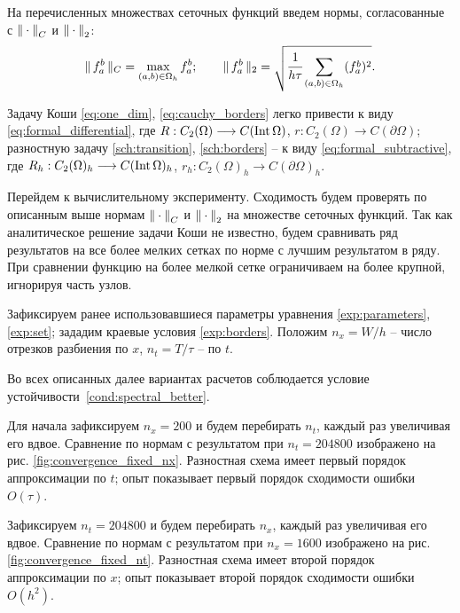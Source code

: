 На перечисленных множествах сеточных функций введем нормы, согласованные с ${\| \cdot \|}_C$ и ${\| \cdot \|}_2$:
$$\| \, f_a^b \, \|_C = \max \limits_{(a, b) \in \Omega_h} f_a^b; \qquad \| \, f_a^b \, \|_2 = \sqrt{\cfrac{1}{h \tau}\sum \limits_{(a, b) \in \Omega_h} (f_a^b)^2} {\text{.}}$$

Задачу Коши \eqref{eq:one_dim}, \eqref{eq:cauchy_borders} легко привести к виду \eqref{eq:formal_differential}, где $R: C_2(\Omega) \longrightarrow C(\operatorname{{Int}} \Omega)$, $r: C_2(\Omega) \longrightarrow C(\partial \Omega)$; разностную задачу \eqref{sch:transition}, \eqref{sch:borders} -- к виду \eqref{eq:formal_subtractive}, где $R_h: C_2(\Omega)_h \longrightarrow C(\operatorname{{Int}} \Omega)_h$, $r_h: C_2(\Omega)_h \longrightarrow C(\partial \Omega)_h$.

Перейдем к вычислительному эксперименту. Сходимость будем проверять по описанным выше нормам ${\| \cdot \|}_C$ и ${\| \cdot \|}_2$ на множестве сеточных функций. Так как аналитическое решение задачи Коши не известно, будем сравнивать ряд результатов на все более мелких сетках по норме с лучшим результатом в ряду. При сравнении функцию на более мелкой сетке ограничиваем на более крупной, игнорируя часть узлов.

Зафиксируем ранее использовавшиеся параметры уравнения \eqref{exp:parameters}, \eqref{exp:set}; зададим краевые условия \eqref{exp:borders}. Положим $n_x = W / h$ -- число отрезков разбиения по $x$, $n_t = T / \tau$ -- по $t$.

Во всех описанных далее вариантах расчетов соблюдается условие устойчивости~\eqref{cond:spectral_better}.

Для начала зафиксируем $n_x = 200$ и будем перебирать $n_t$, каждый раз увеличивая его вдвое. Сравнение по нормам с результатом при $n_t = 204800$ изображено на рис. \ref{fig:convergence_fixed_nx}. Разностная схема имеет первый порядок аппроксимации по $t$; опыт показывает первый порядок сходимости ошибки $O(\tau)$.

Зафиксируем $n_t = 204800$ и будем перебирать $n_x$, каждый раз увеличивая его вдвое. Сравнение по нормам с результатом при $n_x = 1600$ изображено на рис. \ref{fig:convergence_fixed_nt}. Разностная схема имеет второй порядок аппроксимации по $x$; опыт показывает второй порядок сходимости ошибки $O(h^2)$.

